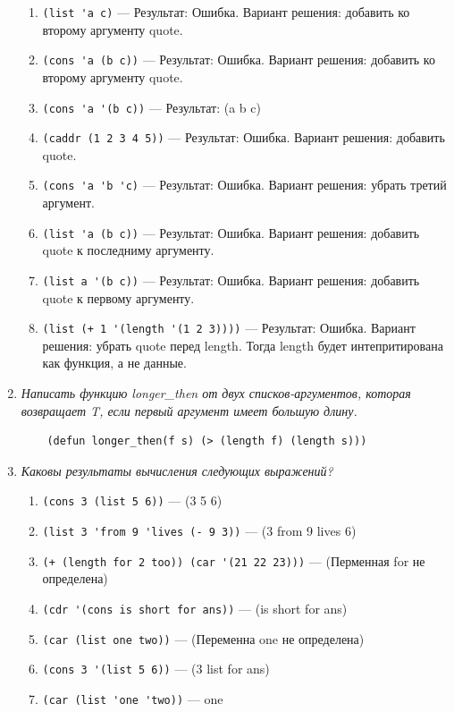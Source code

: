 \begin{enumerate}[wide=0pt]
\begin{enumerate}[label=\arabic*)]
	\item \lstinline {(list 'a c)} --- 
	Результат: Ошибка. 
	Вариант решения: добавить ко второму аргументу quote.
	\item \lstinline {(cons 'a (b c))} --- 
	Результат: Ошибка. 
	Вариант решения: добавить ко второму аргументу quote.
	\item \lstinline {(cons 'a '(b c))} --- 
	Результат: (a b c) 
	\item \lstinline {(caddr (1 2 3 4 5))} --- 
	Результат: Ошибка. 
	Вариант решения: добавить quote.
	\item \lstinline {(cons 'a 'b 'c)} --- 
	Результат: Ошибка. 
	Вариант решения: убрать третий аргумент.
	\item \lstinline {(list 'a (b c))} --- 
	Результат: Ошибка. 
	Вариант решения: добавить quote к последниму аргументу.
	\item \lstinline {(list a '(b c))}  --- 
	Результат: Ошибка. 
	Вариант решения: добавить quote к первому аргументу.
	\item \lstinline {(list (+ 1 '(length '(1 2 3))))}  --- 
	Результат: Ошибка. 
	Вариант решения: убрать quote перед length. Тогда length будет интепритирована как функция, а не данные.
	
\end{enumerate}

\item \textit{Написать функцию longer\_then от двух списков-аргументов, 
которая возвращает T, если первый аргумент имеет большую длину.}


\begin{lstlisting}
	(defun longer_then(f s) (> (length f) (length s)))
\end{lstlisting}

\item \textit{Каковы результаты вычисления следующих выражений?}

\begin{enumerate}[label=\arabic*)]
	\item \lstinline {(cons 3 (list 5 6))} --- (3 5 6)
	\item \lstinline {(list 3 'from 9 'lives (- 9 3))} --- (3 from 9 lives 6)
	\item \lstinline {(+ (length for 2 too)) (car '(21 22 23)))} --- (Перменная for не определена)
	\item \lstinline {(cdr '(cons is short for ans))} --- (is short for ans)
	\item \lstinline {(car (list one two))} --- (Переменна one не определена)
	\item \lstinline {(cons 3 '(list 5 6))} --- (3 list for ans)
	\item \lstinline {(car (list 'one 'two))} --- one


\end{enumerate}
\end{enumerate}
